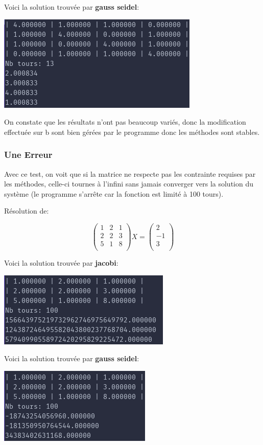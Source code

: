 \documentclass[a4paper]{article}
\begin{document}
Voici la solution trouvée par \textbf{gauss seidel}:

\includegraphics[scale=0.5]{./img/gauss_seidel/g_e_ex_1_mod.png}

On constate que les résultats n'ont pas beaucoup variés, donc la modification
effectuée sur b sont bien gérées par le programme donc les méthodes sont stables.

\subsubsection{Une Erreur}

Avec ce test, on voit que si la matrice ne respecte pas les contrainte requises
par les méthodes, celle-ci tournes à l'infini sans jamais converger vers la
solution du système (le programme s'arrête car la fonction est limité à 100 tours).

Résolution de:

\[
\begin{pmatrix}
  1 & 2 & 1\\
  2 & 2 & 3\\
  5 & 1 & 8\\
\end{pmatrix} X =
\begin{pmatrix}
  2\\
  -1\\
  3\\
\end{pmatrix}
\]

Voici la solution trouvée par \textbf{jacobi}:

\includegraphics[scale=0.5]{./img/jacobi/jac_ex_3.png}

Voici la solution trouvée par \textbf{gauss seidel}:

\includegraphics[scale=0.5]{./img/gauss_seidel/g_e_fail.png}
\end{document}
